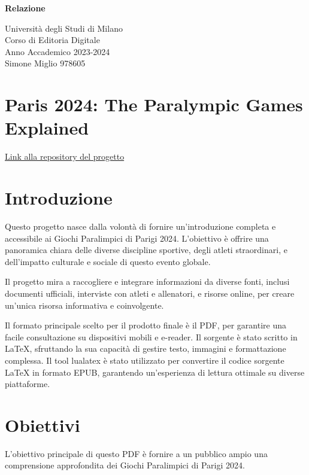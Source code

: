 \documentclass[a4paper,12pt]{report}
\begin{document}
\begin{center}
\Large \textbf{Relazione} 

\bigskip

\large Università degli Studi di Milano \\
Corso di Editoria Digitale \\
Anno Accademico 2023-2024 \\
Simone Miglio 978605

\bigskip
\end{center}

\section*{Paris 2024: The Paralympic Games Explained} 

\href{https://github.com/IlDivinatore01/Editoria_Digitale}{Link alla repository del progetto} %

\section{Introduzione}

Questo progetto nasce dalla volontà di fornire un'introduzione completa e accessibile ai Giochi Paralimpici di Parigi 2024. L'obiettivo è offrire una panoramica chiara delle diverse discipline sportive, degli atleti straordinari, e dell'impatto culturale e sociale di questo evento globale.

Il progetto mira a raccogliere e integrare informazioni da diverse fonti, inclusi documenti ufficiali, interviste con atleti e allenatori, e risorse online, per creare un'unica risorsa informativa e coinvolgente.

Il formato principale scelto per il prodotto finale è il PDF, per garantire una facile consultazione su dispositivi mobili e e-reader. Il sorgente è stato scritto in LaTeX, sfruttando la sua capacità di gestire testo, immagini e formattazione complessa.  Il tool lualatex è stato utilizzato per convertire il codice sorgente LaTeX in formato EPUB, garantendo un'esperienza di lettura ottimale su diverse piattaforme.

\section{Obiettivi}

L'obiettivo principale di questo PDF è fornire a un pubblico ampio una comprensione approfondita dei Giochi Paralimpici di Parigi 2024. 
\end{document}
